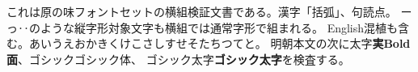 \documentclass[pdflatex,pdftex_fontset=haranoaji]{jlreq}
\begin{document}
これは原の味フォントセットの横組検証文書である。漢字「括弧」、句読点。
ーっ‥のような縦字形対象文字も横組では通常字形で組まれる。
English混植も含む。あいうえおかきくけこさしすせそたちつてと。
明朝本文の次に太字\textbf{実Bold面}、ゴシック{\gtfamily ゴシック体}、
ゴシック太字{\gtfamily\bfseries ゴシック太字}を検査する。
\end{document}
